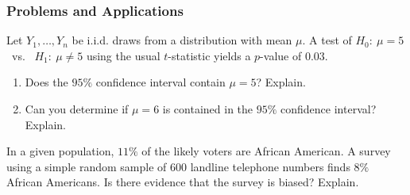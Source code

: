 

\begin{frame}
\frametitle{Problems and Applications}
Let $Y_1,\ldots,Y_n$ be i.i.d. draws from a distribution with mean $\mu$. A test of $H_0{:}~ \mu=5$ ~vs.~ $H_1{:}~ \mu \ne 5$ using the usual $t$-statistic yields a $p$-value of $0.03$.
\begin{enumerate}
\item Does the $95\%$ confidence interval contain $\mu=5$? Explain.
\item Can you determine if $\mu=6$ is contained in the $95\%$ confidence interval? Explain.
\end{enumerate}
\bigskip
\pause
{}
In a given population, $11\%$ of the likely voters are African American. A survey using a simple random sample of $600$ landline telephone numbers finds $8\%$ African Americans. Is there evidence that the survey is biased? Explain.
\end{frame}
